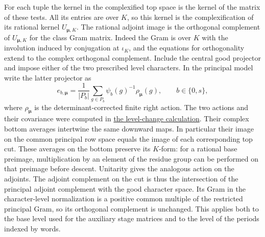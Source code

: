 For each tuple the kernel in the complexified top space is
the kernel of the matrix of these tests. All its entries are
over \(K\), so this kernel is the complexification of its
rational kernel \(U_{\boldsymbol\mu,K}\).
The rational adjoint image is the orthogonal complement of
\(U_{\boldsymbol\mu,K}\) for the class Gram matrix. Indeed the Gram
is over \(K\) with the involution induced by conjugation at
\(\iota_K\), and the equations for orthogonality extend to the
complex orthogonal complement. Include the central good projector
and impose either of the two prescribed level characters. In the
principal model write the latter projector as
\[
 e_{b,\boldsymbol\mu}
    = \frac{1}{|P_b|}\sum_{g\in P_b}\psi_b(g)^{-1}\rho_{\boldsymbol\mu}(g),
 \qquad b\in\{0,s\},
\]
where \(\rho_{\boldsymbol\mu}\) is the determinant-corrected
finite right action. The two actions and their covariance were
computed in \hyperlink{proof.principal-level-projection}{the
level-change calculation}. Their complex bottom averages intertwine
the same downward maps. In particular their image on the common
principal row space equals the image of each corresponding top
cut. These averages on the bottom preserve its \(K\)-form: for a
rational base preimage, multiplication by an element of the residue
group can be performed on that preimage before descent. Unitarity
gives the analogous action on the adjoints. The adjoint complement
on the cut is thus the intersection of the principal adjoint
complement with the good character space. Its Gram in the
character-level normalization is a positive common multiple of the
restricted principal Gram, so its orthogonal complement is
unchanged. This applies both to the base level used for the
auxiliary stage matrices and to the level of the periods indexed
by words.

